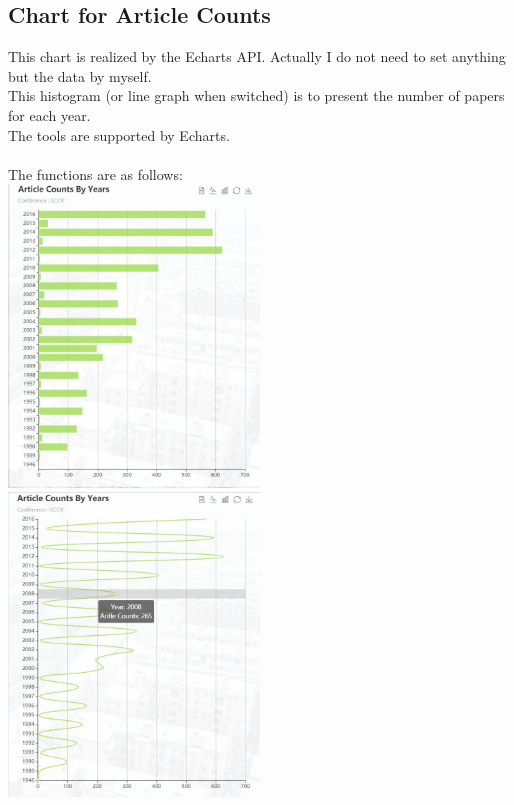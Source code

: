 \documentclass{article}
\begin{document}
	\subsection{Chart for Article Counts}
	This chart is realized by the Echarts API. Actually I do not need to set anything but the data by myself.\\
	This histogram (or line graph when switched) is to present the number of papers for each year.\\
	The tools are supported by Echarts.\\\\
	The functions are as follows:\\
	\includegraphics[width=0.5\textwidth]{year.jpg}
	\includegraphics[width=0.5\textwidth]{year1.jpg}
	
\end{document}
